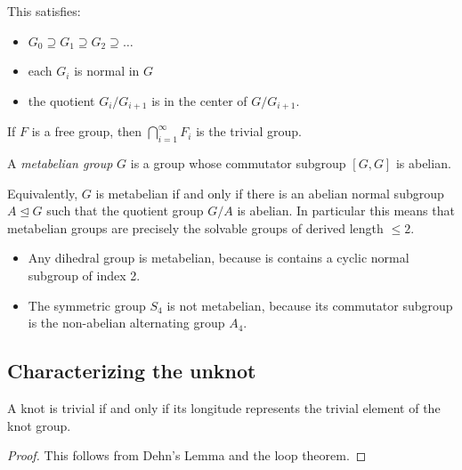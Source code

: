 \begin{proposition}
	This satisfies:
	\begin{itemize}
		\item $G_0 \supseteq G_1 \supseteq G_2 \supseteq \ldots$
		\item each $G_{i}$ is normal in $G$
		\item the quotient $G_{i} / G_{i+1}$ is in the center of $G / G_{i+1}$.
	\end{itemize}
\end{proposition}

\begin{lemma}
	If $F$ is a free group, then $\bigcap_{i=1}^{\infty} F_{i}$ is the
	trivial group.
\end{lemma}


\begin{definition}
	A \textit{metabelian group}  $G$ is a group
	whose commutator subgroup $[G, G]$ is abelian.
	
	Equivalently, $G$ is metabelian if and only if there is an
	abelian normal subgroup $A \trianglelefteq G$
	such that the quotient group $G/A$ is abelian.
	In particular this means that metabelian groups
	are precisely the solvable groups of
	derived length
	$\le 2$.
\end{definition}

\begin{example}
	\begin{itemize}
		\item Any dihedral group is metabelian, because
		is contains a cyclic normal subgroup of index 2.
		
		\item The symmetric group $S_{4}$ is not metabelian, because
		its commutator subgroup is the non-abelian alternating
		group $A_{4}$.
	\end{itemize}
\end{example}


\subsection{Characterizing the unknot}

\begin{proposition}
	A knot is trivial if and only if its longitude
	represents the trivial element of the knot group. 
\end{proposition}
\begin{proof}
	This follows from Dehn's Lemma and the loop theorem.
\end{proof}

